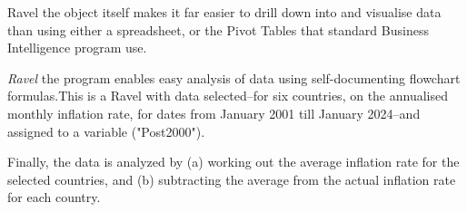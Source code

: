 Ravel the object itself makes it far easier to drill down into and
visualise data than using either a spreadsheet, or the Pivot Tables
that standard Business Intelligence program use.

\emph{Ravel} the program enables easy analysis of data using self-documenting
flowchart formulas.This is a Ravel with data selected--for six countries,
on the annualised monthly inflation rate, for dates from January 2001
till January 2024--and assigned to a variable ("Post2000").
\noindent \begin{flushleft}
\par\end{flushleft}

Finally, the data is analyzed by (a) working out the average inflation
rate for the selected countries, and (b) subtracting the average from
the actual inflation rate for each country.

